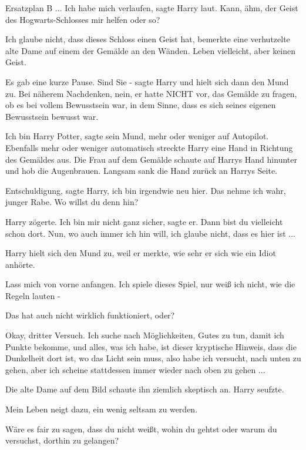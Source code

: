 Ersatzplan B ... \glqq{}Ich habe mich verlaufen\grqq{}, sagte Harry laut. \glqq{}
Kann, ähm, der Geist des Hogwarts-Schlosses mir helfen oder so?\grqq{}

\glqq{}Ich glaube nicht, dass dieses Schloss einen Geist hat\grqq{}, bemerkte
eine verhutzelte alte Dame auf einem der Gemälde an den Wänden. \glqq{}Leben
vielleicht, aber keinen Geist.\grqq{}

Es gab eine kurze Pause. \glqq{}Sind Sie -\grqq{} sagte Harry und hielt sich dann
den Mund zu. Bei näherem Nachdenken, nein, er hatte NICHT vor, das Gemälde zu
fragen, ob es bei vollem Bewusstsein war, in dem Sinne, dass es sich seines
eigenen Bewusstsein bewusst war.

\glqq{}Ich bin Harry Potter\grqq{}, sagte sein Mund, mehr oder weniger auf
Autopilot. Ebenfalls mehr oder weniger automatisch streckte Harry eine Hand in
Richtung des Gemäldes aus. Die Frau auf dem Gemälde schaute auf Harrys Hand
hinunter und hob die Augenbrauen. Langsam sank die Hand zurück an Harrys Seite.

\glqq{}Entschuldigung\grqq{}, sagte Harry, \glqq{}ich bin irgendwie neu
hier.\grqq{} \glqq{}Das nehme ich wahr, junger Rabe. Wo willst du denn
hin?\grqq{}

Harry zögerte. \glqq{}Ich bin mir nicht ganz sicher\grqq{}, sagte er. \glqq{}Dann
bist du vielleicht schon dort.\grqq{} \glqq{}Nun, wo auch immer ich hin will, ich
glaube nicht, dass es hier ist ...\grqq{}

Harry hielt sich den Mund zu, weil er merkte, wie sehr er sich wie ein Idiot
anhörte.

\glqq{}Lass mich von vorne anfangen. Ich spiele dieses Spiel, nur weiß ich nicht,
wie die Regeln lauten -\grqq{}

Das hat auch nicht wirklich funktioniert, oder?

\glqq{}Okay, dritter Versuch. Ich suche nach Möglichkeiten, Gutes zu tun, damit
ich Punkte bekomme, und alles, was ich habe, ist dieser kryptische Hinweis, dass
die Dunkelheit dort ist, wo das Licht sein muss, also habe ich versucht, nach
unten zu gehen, aber ich scheine stattdessen immer wieder nach oben zu gehen
...\grqq{}

Die alte Dame auf dem Bild schaute ihn ziemlich skeptisch an. Harry seufzte.

\glqq{}Mein Leben neigt dazu, ein wenig seltsam zu werden.\grqq{}

\glqq{}Wäre es fair zu sagen, dass du nicht weißt, wohin du gehtst oder warum du
versuchst, dorthin zu gelangen?\grqq{}

